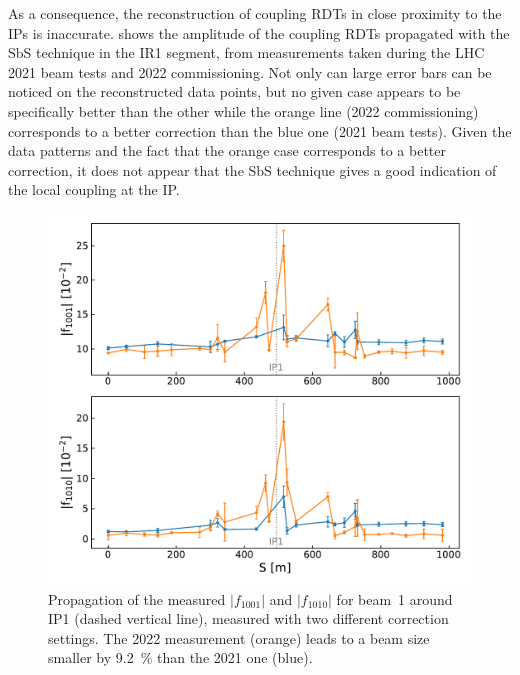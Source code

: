 As a consequence, the reconstruction of coupling RDTs in close proximity to the IPs is inaccurate.
 shows the amplitude of the coupling RDTs propagated with the SbS technique in the IR\num{1} segment, from measurements taken during the LHC \num{2021} beam tests and \num{2022} commissioning.
Not only can large error bars can be noticed on the reconstructed data points, but no given case appears to be specifically better than the other while the \textcolor{mplorange}{orange} line (\num{2022} commissioning) corresponds to a better correction than the \textcolor{mplblue}{blue} one (\num{2021} beam tests).
Given the data patterns and the fact that the orange case corresponds to a better correction, it does not appear that the SbS technique gives a good indication of the local coupling at the IP.

\begin{figure}[!htb]
    \centering
    \includegraphics*[width=\textwidth]{Figures/IR_Coupling_Correction/sbs_coupling_b1_ir1_compare_2021_2022_colin_delta_minus4.pdf}
    \caption{Propagation of the measured \(|f_{1001}|\) and \(|f_{1010}|\) for beam~\num{1} around IP\num{1} (dashed vertical line), measured with two different correction settings. The \num{2022} measurement (\textcolor{mplorange}{orange}) leads to a beam size smaller by \qty{9.2}{\percent} than the \num{2021} one (\textcolor{mplblue}{blue}).}
    \label{figure:beamtest_vs_2022_sbs_abs_f1001_ir1}
\end{figure}

